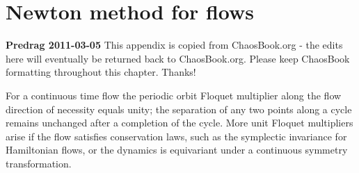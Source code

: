 


\section{Newton method for flows}
\label{s-POs-flows}


{\bf Predrag 2011-03-05}
{This appendix is copied from ChaosBook.org - the edits here will
eventually be returned back to ChaosBook.org. Please keep ChaosBook
formatting throughout this chapter. Thanks!}

\noindent
For a continuous time flow the periodic orbit Floquet
multiplier
along the flow direction of
necessity equals unity; the separation of any two points along
a cycle remains unchanged after a completion of the cycle.
More unit Floquet multipliers arise if the
flow satisfies conservation laws, such as the symplectic
invariance for Hamiltonian flows, or the dynamics is equivariant
under a continuous symmetry transformation.

